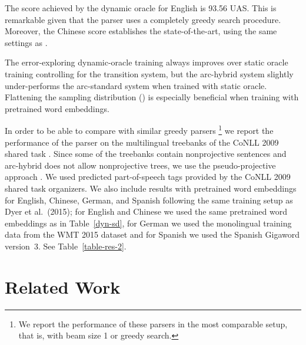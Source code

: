 \documentclass[11pt]{article}
\newcommand{\ignore}[1]{}
\begin{document}
The score achieved by the dynamic oracle for English is 93.56 UAS. This is remarkable given that
the parser uses a completely greedy search procedure. Moreover, the
Chinese score establishes the state-of-the-art, using the same settings as .  

The error-exploring dynamic-oracle training always improves over static oracle training controlling for the transition system, but the arc-hybrid system slightly under-performs
the arc-standard system when trained with static oracle. Flattening the
sampling distribution () is
especially beneficial when training with pretrained word embeddings.




In order to be able to compare with similar greedy parsers
\cite{yazdani-henderson:2015:CoNLL,andor-16}\footnote{We report the
  performance of these parsers in the most comparable setup, that is,
  with beam size 1 or greedy search.} we report the performance of
the parser on the multilingual treebanks of the CoNLL 2009 shared task
\cite{conll2009}. Since some of the treebanks contain nonprojective
sentences and arc-hybrid does not allow nonprojective trees, we use
the pseudo-projective approach \cite{nivre05acl}. We used predicted
part-of-speech tags provided by the CoNLL 2009 shared task
organizers. We also include results with pretrained word embeddings
for English, Chinese, German, and Spanish following the same training
setup as Dyer et al.~(2015); for English and Chinese we used the same
pretrained word embeddings as in Table~\ref{dyn-sd}, for German we
used the monolingual training data from the WMT 2015
dataset\ignore{\footnote{\url{http://www.statmt.org/wmt15/translation-task.html}}}
and for Spanish we used the Spanish Gigaword version~3. See Table~\ref{table-res-2}.

\section{Related Work}
\label{sec:related}
\end{document}
